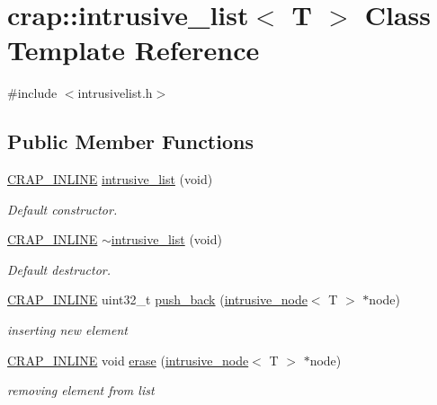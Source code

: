 \hypertarget{classcrap_1_1intrusive__list}{}\section{crap\+:\+:intrusive\+\_\+list$<$ T $>$ Class Template Reference}
\label{classcrap_1_1intrusive__list}


{\ttfamily \#include $<$intrusivelist.\+h$>$}

\subsection*{Public Member Functions}
\begin{DoxyCompactItemize}
\item 
\hyperlink{config__x86_8h_a5a40526b8d842e7ff731509998bb0f1c}{C\+R\+A\+P\+\_\+\+I\+N\+L\+I\+N\+E} \hyperlink{classcrap_1_1intrusive__list_a30a73f1666e50455af5942fdf63c4877}{intrusive\+\_\+list} (void)
\begin{DoxyCompactList}\small\item\em Default constructor. \end{DoxyCompactList}\item 
\hyperlink{config__x86_8h_a5a40526b8d842e7ff731509998bb0f1c}{C\+R\+A\+P\+\_\+\+I\+N\+L\+I\+N\+E} \hyperlink{classcrap_1_1intrusive__list_aad77afd62b21aad4fa78110dfd148d88}{$\sim$intrusive\+\_\+list} (void)
\begin{DoxyCompactList}\small\item\em Default destructor. \end{DoxyCompactList}\item 
\hyperlink{config__x86_8h_a5a40526b8d842e7ff731509998bb0f1c}{C\+R\+A\+P\+\_\+\+I\+N\+L\+I\+N\+E} uint32\+\_\+t \hyperlink{classcrap_1_1intrusive__list_a9347e122e7a28be81f7fc5f7691953c7}{push\+\_\+back} (\hyperlink{classcrap_1_1intrusive__node}{intrusive\+\_\+node}$<$ T $>$ $\ast$node)
\begin{DoxyCompactList}\small\item\em inserting new element \end{DoxyCompactList}\item 
\hyperlink{config__x86_8h_a5a40526b8d842e7ff731509998bb0f1c}{C\+R\+A\+P\+\_\+\+I\+N\+L\+I\+N\+E} void \hyperlink{classcrap_1_1intrusive__list_a4efc5315b9ef4f58d1aa18fe8cf034f7}{erase} (\hyperlink{classcrap_1_1intrusive__node}{intrusive\+\_\+node}$<$ T $>$ $\ast$node)
\begin{DoxyCompactList}\small\item\em removing element from list \end{DoxyCompactList}\item 

\end{DoxyCompactItemize}
